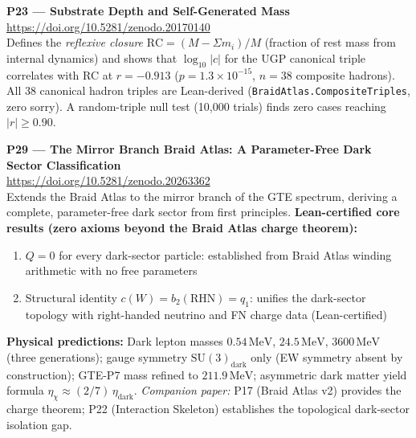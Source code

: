 \documentclass[11pt]{article}
\begin{document}
\medskip
\noindent\textbf{P23 — Substrate Depth and Self-Generated Mass}~\cite{Spivack2026_Closure24}\\
\url{https://doi.org/10.5281/zenodo.20170140}\\
Defines the \emph{reflexive closure} $\mathrm{RC} = (M - \Sigma m_i)/M$
(fraction of rest mass from internal dynamics) and shows that $\log_{10}|c|$
for the UGP canonical triple correlates with RC at $r = -0.913$
($p = 1.3\times10^{-15}$, $n=38$ composite hadrons).  All 38 canonical hadron
triples are Lean-derived (\texttt{BraidAtlas.CompositeTriples}, zero sorry).
A random-triple null test (10,000 trials) finds zero cases reaching $|r| \ge 0.90$.

\medskip
\noindent\textbf{P29 — The Mirror Branch Braid Atlas: A Parameter-Free Dark Sector
Classification}~\cite{SpivackMirrorBraidAtlas}\\
\url{https://doi.org/10.5281/zenodo.20263362}\\
Extends the Braid Atlas to the mirror branch of the GTE spectrum, deriving a
complete, parameter-free dark sector from first principles.
\textbf{Lean-certified core results (zero axioms beyond the Braid Atlas charge theorem):}
\begin{enumerate}[noitemsep,topsep=2pt]
\item $Q = 0$ for every dark-sector particle: established from Braid Atlas winding
  arithmetic with no free parameters
\item Structural identity $c(W) = b_2(\mathrm{RHN}) = q_1$: unifies the dark-sector
  topology with right-handed neutrino and FN charge data (Lean-certified)
\end{enumerate}
\textbf{Physical predictions:}
Dark lepton masses $0.54\,\mathrm{MeV}$, $24.5\,\mathrm{MeV}$, $3600\,\mathrm{MeV}$
(three generations); gauge symmetry $\mathrm{SU}(3)_\mathrm{dark}$ only (EW
symmetry absent by construction); GTE-P7 mass refined to $211.9\,\mathrm{MeV}$;
asymmetric dark matter yield formula $\eta_\chi \approx (2/7)\,\eta_\mathrm{dark}$.
\emph{Companion paper:} P17 (Braid Atlas v2) provides the charge theorem; P22
(Interaction Skeleton) establishes the topological dark-sector isolation gap.
\end{document}
